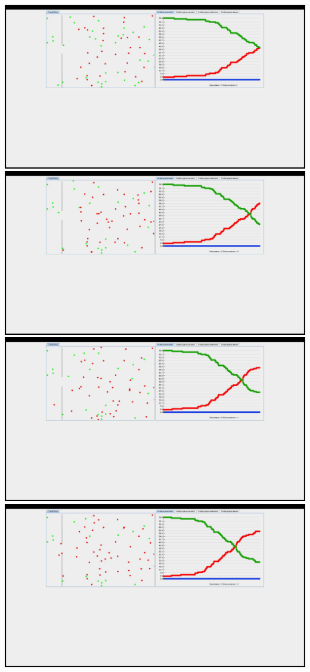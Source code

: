 \documentclass{report}
\begin{document}
\includegraphics[scale=0.20]{9}
\includegraphics[scale=0.20]{10}
\includegraphics[scale=0.20]{11}
\includegraphics[scale=0.20]{12}
\end{document}
